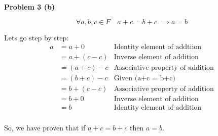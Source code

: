 \documentclass{article}
\begin{document}
\begin{flushleft}
   \textbf{\Large Problem 3 (b)}
\end{flushleft}

\[
   \forall a,b,c \in F \quad a + c = b + c \implies a = b
\]

Lets go step by step: \\
\begin{align}
   a &= a + 0 &\text{Identity element of addtiion} \\
     &= a + (c - c) &\text{Inverse element of addition} \\
     &= (a + c) - c &\text{Associative property of addition} \\
     &= (b + c) - c &\text{Given (a+c = b+c)} \\
     &= b + (c - c) &\text{Associative property of addition} \\
     &= b + 0 &\text{Inverse element of addition} \\
     &= b &\text{Identity element of addition}
\end{align}
\\
So, we have proven that if \(a + c = b + c\) then \(a = b\). \\
\end{document}
